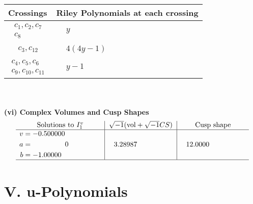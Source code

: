 \documentclass[1p]{elsarticle_modified}
\theoremstyle{definition}
\newcommand{\I}{\sqrt{-1}}
\begin{document}
\begin{tabular}{m{50pt}|m{274pt}}
Crossings & \hspace{64pt}Riley Polynomials at each crossing \\
\hline $$\begin{aligned}c_{1},c_{2},c_{7}\\c_{8}\end{aligned}$$&$\begin{aligned}
&y
\end{aligned}$\\
\hline $$\begin{aligned}c_{3},c_{12}\end{aligned}$$&$\begin{aligned}
&4(4 y-1)
\end{aligned}$\\
\hline $$\begin{aligned}c_{4},c_{5},c_{6}\\c_{9},c_{10},c_{11}\end{aligned}$$&$\begin{aligned}
&y-1
\end{aligned}$\\
\hline
\end{tabular}\\~\\
\newpage\flushleft \textbf{(vi) Complex Volumes and Cusp Shapes}
$$\begin{array}{c|c|c}  
\text{Solutions to }I^v_{1}& \I (\text{vol} + \sqrt{-1}CS) & \text{Cusp shape}\\
 \hline 
\begin{aligned}
v &= -0.500000\phantom{ +0.000000I} \\
a &= \phantom{-0.000000 } 0 \\
b &= -1.00000\phantom{ +0.000000I}\end{aligned}
 & \phantom{-}3.28987\phantom{ +0.000000I} & \phantom{-}12.0000\phantom{ +0.000000I}\\
 \hline 
 \end{array}$$\newpage
\newpage\renewcommand{\arraystretch}{1}
\centering \section*{ V. u-Polynomials}
\end{document}

